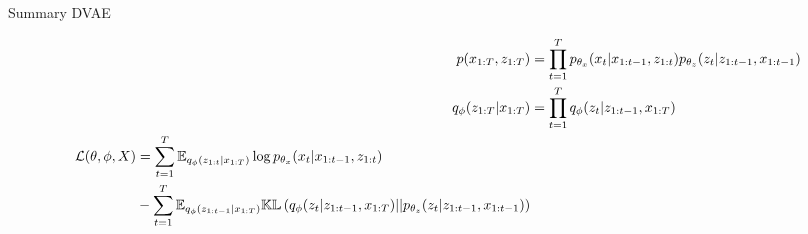 \begin{frame}{Summary DVAE}
    \begin{tcolorbox}[colback=blue!5!white,colframe=black!75!black,title=General Dynamical VAEs : generative and inference models; variational lower bound]
            \begin{align}
                \label{gen_model_dvae}
                p(x_{1:T}, z_{1:T}) &= \prod_{t=1}^T p_{\theta_x} (x_t \vert x_{1:t-1}, z_{1:t}) p_{\theta_z}(z_t \vert z_{1:t-1}, x_{1:t-1}) \\
                \label{inf_model_dvae}
                q_{\phi}(z_{1:T} \vert x_{1:T}) &= \prod_{t=1}^T q_\phi(z_t \vert z_{1:t-1}, x_{1:T}) \\
                \label{vlb_dvae}
                \begin{split}
                 \mathcal{L}(\theta, \phi, X) &= \sum_{t=1}^T \mathbb{E}_{q_\phi(z_{1:t} \vert x_{1:T})} \log{p_{\theta_x}(x_t \vert x_{1:t-1}, z_{1:t})} \\ &- \sum_{t=1}^T \mathbb{E}_{q_\phi(z_{1:t-1} \vert x_{1:T})} \mathbb{KL}\left( q_\phi(z_t \vert z_{1:t-1}, x_{1:T}) \vert\vert p_{\theta_z}(z_t \vert z_{1:t-1}, x_{1:t-1}) \right)
                 \end{split}
            \end{align}
    \end{tcolorbox}
\end{frame}

%
%
%
%
%
%

